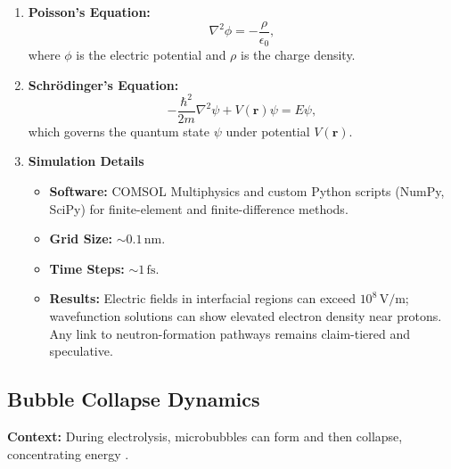 \documentclass[11pt,a4paper]{article}
\begin{document}
\begin{enumerate}
\def\labelenumi{\arabic{enumi}.}
\item
  \textbf{Poisson's Equation:} \begin{equation}
\nabla^{2}\phi = -\frac{\rho}{\epsilon_0},
\end{equation} where $\phi$ is the electric potential and $\rho$ is the charge density.
\item
  \textbf{Schr\"{o}dinger's Equation:} \begin{equation}
-\frac{\hbar^{2}}{2m}\nabla^{2}\psi + V(\mathbf{r})\psi = E\psi,
\end{equation} which governs the quantum state $\psi$ under potential $V(\mathbf{r})$.
\item
  \textbf{Simulation Details}

  \begin{itemize}
    \item
    \textbf{Software:} COMSOL Multiphysics and custom Python scripts (NumPy, SciPy) for finite-element and finite-difference methods.\\
  \item
    \textbf{Grid Size:} $\sim 0.1\,\text{nm}$.\\
  \item
    \textbf{Time Steps:} $\sim 1\,\text{fs}$.\\
  \item
    \textbf{Results:} Electric fields in interfacial regions can exceed $10^{8}\,\text{V/m}$; wavefunction solutions can show elevated electron density near protons. Any link to neutron-formation pathways remains claim-tiered and speculative.
  \end{itemize}
\end{enumerate}

\subsection{Bubble Collapse Dynamics}

\textbf{Context:} During electrolysis, microbubbles can form and then collapse, concentrating energy \citep{taleyarkhan2002}.
\end{document}

